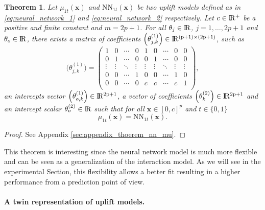\documentclass{article}
\def\x{\mathbf x}
\def \real{\rm I\!R}
\newtheorem{theorem}{Theorem}
\begin{document}
\begin{theorem} \label{theorem}
Let $\mu_{1t}(\x)$ and $\mathrm{NN}_{1t}(\x)$ be two uplift models defined as in \eqref{eq:neural_network_1} and \eqref{eq:neural_network_2} respectively. Let $c \in \real^+$ be a positive and finite constant and $m=2p+1$. For all $\theta_j \in \real$, $j=1,\ldots,2p+1$ and $\theta_o \in \real$, there exists a matrix of coefficients $\Big(\theta_{j,k}^{(1)}\Big) \in \real^{(p+1) \times (2p+1)}$, such as
\[ \Big(\theta_{j,k}^{(1)}\Big) = 
\left(
\begin{array}{cccc|cccc|c}
1 & 0 & \cdots & 0 & 1 & 0 & \cdots & 0 & 0  \\
0 & 1 & \cdots & 0 & 0 & 1 & \cdots & 0 & 0  \\
\vdots  & \vdots  & \ddots & \vdots & \vdots  & \vdots  & \ddots & \vdots & \vdots  \\
0 & 0 & \cdots & 1 & 0 & 0 & \cdots & 1 & 0  \\
\hline
0 & 0 & \cdots & 0 & c & c & \cdots & c & 1  \\
\end{array}
\right),
\]
an intercepts vector $\Big(\theta_{o,k}^{(1)}\Big) \in \real^{2p+1}$, a vector of coefficients $\Big(\theta_{k}^{(2)}\Big) \in \real^{2p+1}$ and an intercept scalar $\theta_o^{(2)} \in \real$ such that for all $\x \in [0,c]^p$ and $t \in \{0,1\}$
\begin{equation}
    \mu_{1t}(\x) = \mathrm{NN}_{1t}(\x).
    \label{eq:theorem_equality}
\end{equation}
\end{theorem}

\begin{proof}
See Appendix \ref{sec:appendix_thoerem_nn_mu}.
\end{proof}

This theorem is interesting since the neural network model is much more flexible and can be seen as a generalization of the interaction model. As we will see in the experimental Section, this flexibility allows a better fit resulting in a higher performance from a prediction point of view.

\paragraph{A twin representation of uplift models.}
\end{document}
